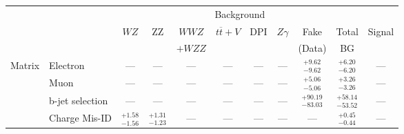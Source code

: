 \small\renewcommand{\tabcolsep}{1pt}
\begin{tabular}{|cl||ccccccc|c||c|}
\hline
 & & \multicolumn{8}{c||}{Background} & \\ 
 & & $WZ$ & ZZ & $WWZ$ & $t\overline{t}+V$ & DPI & $Z\gamma$ & Fake & Total & Signal\\ 
 & & &  & $+WZZ$ &  &  &  & (Data) & BG & \\ 
\hline\hline
\multirow{2}{*}{Matrix}
&Electron & --- & --- & --- & --- & --- & --- &  $^{+9.62}_{-9.62}$  &  $^{+6.20}_{-6.20}$  & ---\\ 
\cline{2-11}
\multirow{2}{*}{Method}
&Muon & --- & --- & --- & --- & --- & --- &  $^{+5.06}_{-5.06}$  &  $^{+3.26}_{-3.26}$  & ---\\ 
\cline{2-11}
&b-jet selection & --- & --- & --- & --- & --- & --- &  $^{+90.19}_{-83.03}$  &  $^{+58.14}_{-53.52}$  & ---\\ 
\hline
&Charge Mis-ID &  $^{+1.58}_{-1.56}$  &  $^{+1.31}_{-1.23}$  & --- & --- & --- & --- & --- &  $^{+0.45}_{-0.44}$  & ---\\ 
\hline
\end{tabular}
